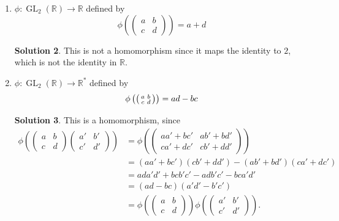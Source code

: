 \documentclass{article}
\newcommand{\RR}{\mathbb{R}}
\DeclareMathOperator{\GL}{GL}
\theoremstyle{definition}
\newtheorem*{solution}{Solution}
\begin{document}
\begin{enumerate}
\begin{enumerate}
\[\]
\begin{solution}
This is a homomorphism since $\begin{psmallmatrix} 1 & 0 \\ a & 1 \end{psmallmatrix} \begin{psmallmatrix} 1 & 0 \\ b & a \end{psmallmatrix} = \begin{psmallmatrix} 1 & 0 \\ a+b & 1 \end{psmallmatrix}$.  The kernel is $\{0\} \subset \RR$.
\end{solution}
\item $\phi : \GL_2(\RR) \to \RR$ defined by 
\[
\phi\left(\begin{pmatrix} a & b \\ c & d \end{pmatrix}\right) = a + d
\]
\begin{solution}
This is not a homomorphism since it maps the identity to $2$, which is not the identity in $\RR$.
\end{solution}
\item $\phi : \GL_2(\RR) \to \RR^*$ defined by 
\[
\phi\left(\begin{psmallmatrix} a & b \\ c & d \end{psmallmatrix}\right) = ad - bc
\]
\begin{solution}
This is a homomorphism, since
\begin{align*}
\phi\left(\begin{pmatrix} a & b \\ c & d \end{pmatrix}\begin{pmatrix} a' & b' \\ c' & d' \end{pmatrix}\right) &= \phi\left(\begin{pmatrix} aa'+bc' & ab'+bd' \\ ca'+dc' & cb'+dd' \end{pmatrix}\right) \\
&= (aa'+bc')(cb'+dd') - (ab'+bd')(ca'+dc') \\
&= ada'd' + bcb'c' - adb'c' - bca'd' \\
&= (ad - bc)(a'd' - b'c') \\
&= \phi\left(\begin{pmatrix} a & b \\ c & d \end{pmatrix}\right) \phi\left(\begin{pmatrix} a' & b' \\ c' & d' \end{pmatrix}\right).

\end{align*}
\end{solution}
\end{enumerate}
\end{enumerate}
\end{document}
